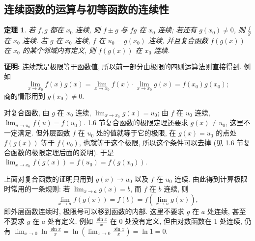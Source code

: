 \documentclass[UTF8,openany]{ctexbook}
\theoremstyle{chinesetextbook}
\newtheorem{theorem}{定理}[section]
\newenvironment{cnproof}{\par\indent\textbf{证明:} \ignorespaces}{\par}
\begin{document}
\subsection{连续函数的运算与初等函数的连续性}
\begin{theorem}
若 $f,g$ 都在 $x_0$ 连续, 则 $f\pm g$ 与 $fg$ 在 $x_0$ 连续; 若还有 $g(x_0)\ne0$, 则 $\displaystyle\frac fg$ 在 $x_0$ 连续. 若 $g$ 在 $x_0$ 连续, $f$ 在 $u_0=g(x_0)$ 连续, 并且复合函数 $f(g(x))$ 在 $x_0$ 的某个邻域内有定义, 则 $f(g(x))$ 在 $x_0$ 连续.
\end{theorem}
\begin{cnproof}
连续就是极限等于函数值, 所以前一部分由极限的四则运算法则直接得到. 例如
\[
\lim_{x\to x_0}f(x)g(x)=\lim_{x\to x_0}f(x)\cdot\lim_{x\to x_0}g(x)=f(x_0)g(x_0);
\]
商的情形用到 $g(x_0)\ne0$.

对复合函数, 由 $g$ 在 $x_0$ 连续, $\displaystyle\lim_{x\to x_0}g(x)=u_0$; 由 $f$ 在 $u_0$ 连续, $\displaystyle\lim_{u\to u_0}f(u)=f(u_0)$. 1.6 节复合函数的极限定理还要求 $g(x)\ne u_0$, 这里不一定满足. 但外层函数 $f$ 在 $u_0$ 处的值就等于它的极限, 在 $g(x)=u_0$ 的点处 $f(g(x))$ 等于 $f(u_0)$, 也就等于这个极限, 所以这个条件可以去掉 (见 1.6 节复合函数的极限定理后面的说明). 于是 $\displaystyle\lim_{x\to x_0}f(g(x))=f(u_0)=f(g(x_0))$.
\end{cnproof}
上面对复合函数的证明只用到 $g(x)\to u_0$ 以及 $f$ 在 $u_0$ 连续. 由此得到计算极限时常用的一条规则: 若 $\displaystyle\lim_{x\to a}g(x)=b$, 而 $f$ 在 $b$ 连续, 则
\[
\lim_{x\to a}f(g(x))=f(b)=f\left(\lim_{x\to a}g(x)\right),
\]
即外层函数连续时, 极限号可以移到函数的内部. 这里不要求 $g$ 在 $a$ 处连续, 甚至不要求 $g$ 在 $a$ 处有定义. 例如 $\displaystyle\frac{\sin x}x$ 在 $0$ 处没有定义, 但由对数函数在 $1$ 处连续, 仍有 $\displaystyle\lim_{x\to0}\ln\frac{\sin x}x=\ln\left(\lim_{x\to0}\frac{\sin x}x\right)=\ln1=0$.
\end{document}
